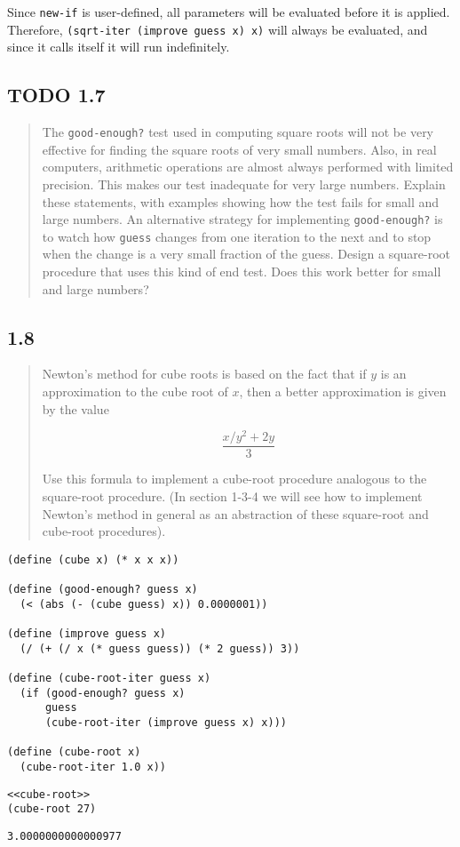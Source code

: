 \documentclass[a4paper, titlepage, twoside]{article}
\begin{document}
Since \texttt{new-if} is user-defined, all parameters will be evaluated before it is applied. Therefore, \texttt{(sqrt-iter (improve guess x) x)} will always be evaluated, and since it calls itself it will run indefinitely.

\subsection*{{\bfseries\sffamily TODO} 1.7}
\label{sec:orged19a36}

\begin{quote}
The \texttt{good-enough?} test used in computing square roots will not be very effective for finding the square roots of very small numbers.  Also, in real computers, arithmetic operations are almost always performed with limited precision.  This makes our test inadequate for very large numbers.  Explain these statements, with examples showing how the test fails for small and large numbers.  An alternative strategy for implementing \texttt{good-enough?} is to watch how \texttt{guess} changes from one iteration to the next and to stop when the change is a very small fraction of the guess.  Design a square-root procedure that uses this kind of end test. Does this work better for small and large numbers?
\end{quote}

\subsection*{1.8}
\label{sec:orge70c293}

\begin{quote}
Newton's method for cube roots is based on the fact that if \(y\) is an approximation to the cube root of \(x\), then a better approximation is given by the value

\begin{equation}
    \frac{x/y^2 + 2y}{3}
\end{equation}

Use this formula to implement a cube-root procedure analogous to the square-root procedure. (In section 1-3-4 we will see how to implement Newton's method in general as an abstraction of these square-root and cube-root procedures).
\end{quote}

\begin{verbatim}
(define (cube x) (* x x x))

(define (good-enough? guess x)
  (< (abs (- (cube guess) x)) 0.0000001))

(define (improve guess x)
  (/ (+ (/ x (* guess guess)) (* 2 guess)) 3))

(define (cube-root-iter guess x)
  (if (good-enough? guess x)
      guess
      (cube-root-iter (improve guess x) x)))

(define (cube-root x)
  (cube-root-iter 1.0 x))
\end{verbatim}

\begin{verbatim}
<<cube-root>>
(cube-root 27)
\end{verbatim}

\begin{verbatim}
3.0000000000000977
\end{verbatim}
\end{document}

